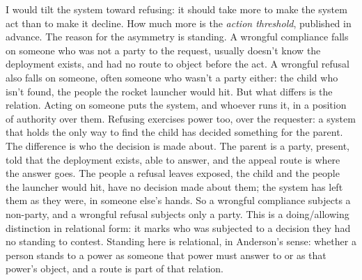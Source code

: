 I would tilt the system toward refusing: it should take more to make the system act than to make it decline. How much more is the \emph{action threshold}, published in advance. The reason for the asymmetry is standing. A wrongful compliance falls on someone who was not a party to the request, usually doesn't know the deployment exists, and had no route to object before the act. A wrongful refusal also falls on someone, often someone who wasn't a party either: the child who isn't found, the people the rocket launcher would hit. But what differs is the relation. Acting on someone puts the system, and whoever runs it, in a position of authority over them. Refusing exercises power too, over the requester: a system that holds the only way to find the child has decided something for the parent. The difference is who the decision is made about. The parent is a party, present, told that the deployment exists, able to answer, and the appeal route is where the answer goes. The people a refusal leaves exposed, the child and the people the launcher would hit, have no decision made about them; the system has left them as they were, in someone else's hands. So a wrongful compliance subjects a non-party, and a wrongful refusal subjects only a party. This is a doing/allowing distinction in relational form: it marks who was subjected to a decision they had no standing to contest. Standing here is relational, in Anderson's sense: whether a person stands to a power as someone that power must answer to or as that power's object, and a route is part of that relation.

